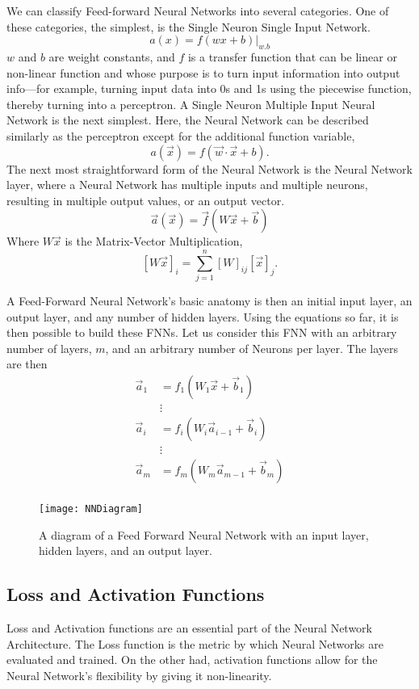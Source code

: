 We can classify Feed-forward Neural Networks into several categories. One of these categories, the simplest, is the Single Neuron Single Input Network. 
$$a(x)=f(wx + b)|_{w.b}$$
$w$ and $b$ are weight constants, and $f$ is a transfer function that can be linear or non-linear function and whose purpose is to turn input information into output info—for example, turning input data into 0s and 1s using the piecewise function, thereby turning into a perceptron. A Single Neuron Multiple Input Neural Network is the next simplest. Here, the Neural Network can be described similarly as the perceptron except for the additional function variable, $$a(\vec{x})=f(\vec{w}\cdot \vec{x}+b).$$ The next most straightforward form of the Neural Network is the Neural Network layer, where a Neural Network has multiple inputs and multiple neurons, resulting in multiple output values, or an output vector. 
$$\vec{a}(\vec{x})=\vec{f}(W\vec{x}+\vec{b})$$ Where $W\vec{x}$ is the Matrix-Vector Multiplication, $$[W\vec{x}]_i=\sum_{j=1}^n [W]_{ij}[\vec{x}]_{j}.$$ 

A Feed-Forward Neural Network's basic anatomy is then an initial input layer, an output layer, and any number of hidden layers. Using the equations so far, it is then possible to build these FNNs. Let us consider this FNN with an arbitrary number of layers, $m$, and an arbitrary number of Neurons per layer. The layers are then 
\begin{align*}
\vec{a}_1 &= f_1(W_1\vec{x} +\vec{b}_1 )\\
&\vdots\\
\vec{a}_i &= f_i(W_i\vec{a}_{i-1}+\vec{b}_i)\\
&\vdots\\
\vec{a}_m &= f_m(W_m\vec{a}_{m-1}+\vec{b}_m)\\
\end{align*}

\begin{figure}
	\centering
	\texttt{[image: NNDiagram]}
	\caption{A diagram of a Feed Forward Neural Network with an input layer, hidden layers, and an output layer.}
	\label{fig:NNDiagram}
\end{figure}

\subsection{Loss and Activation Functions}

Loss and Activation functions are an essential part of the Neural Network Architecture. The Loss function is the metric by which Neural Networks are evaluated and trained. On the other had, activation functions allow for the Neural Network's flexibility by giving it non-linearity.

